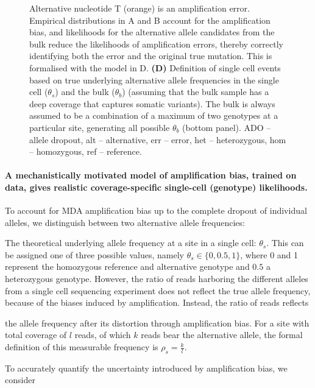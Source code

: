 \documentclass[12pt,inline]{wlscirep}
\begin{document}
\begin{figure}[!tpb]
{   Alternative nucleotide T (orange) is an amplification error.
   Empirical distributions in A and B account for the  amplification bias, and likelihoods for the alternative allele candidates from the bulk reduce the likelihoods of amplification errors, thereby correctly identifying both the error and the original true mutation.
   This is formalised with the model in D.
   \textbf{(D)} Definition of single cell events based on true underlying alternative allele frequencies in the single cell ($\theta_s$) and the bulk ($\theta_b$) (assuming that the bulk sample has a deep coverage that captures somatic variants).
   The bulk is always assumed to be a combination of a maximum of two genotypes at a particular site, generating all possible $\theta_b$ (bottom panel).\small\newline
   ADO -- allele dropout, alt -- alternative, err -- error, het -- heterozygous, hom -- homozygous, ref -- reference.}
  \label{fig:prosolo_alt-calling}
\end{figure}

\paragraph{A mechanistically motivated model of amplification bias, trained on data, gives realistic coverage-specific single-cell (genotype) likelihoods.}
To account for MDA amplification bias up to the complete dropout of individual alleles, we distinguish between two alternative allele frequencies:
\begin{enumerate*}[label={(\roman*)}]
  \item The theoretical underlying allele frequency at a site in a single cell: $\theta_s$.
   This can be assigned one of three possible values, namely $\theta_s\in\{0,0.5,1\}$, where 0 and 1 represent the homozygous reference and alternative genotype and $0.5$ a heterozygous genotype.
   However, the ratio of reads harboring the different alleles from a single cell sequencing experiment does not reflect the true allele frequency, because of the biases induced by amplification. 
  Instead, the ratio of reads reflects
  \item the allele frequency after its distortion through amplification bias.
   For a site with total coverage of $l$ reads, of which $k$ reads bear the alternative allele, the formal definition of this measurable frequency is $\rho_s=\frac{k}{l}$.
\end{enumerate*}
To accurately quantify the uncertainty introduced by amplification bias, we consider  
\end{document}
